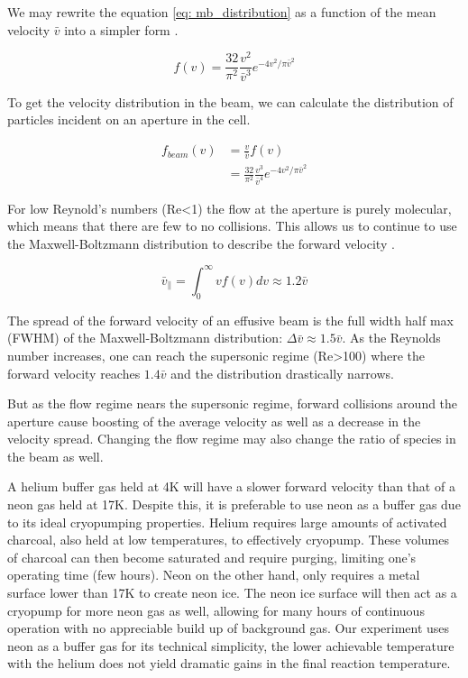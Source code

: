 We may rewrite the equation \ref{eq: mb_distribution} as a function of the mean velocity $\bar{v}$ into a simpler form .

\begin{equation}
	f(v) = \frac{32}{\pi^2} \frac{v^2}{\bar{v}^3} e^{-4v^2/\pi \bar{v}^2} \label{eq: mb_simplified}
\end{equation}

To get the velocity distribution in the beam, we can calculate the distribution of particles incident on an aperture in the cell.

\begin{align*}
	f_{beam}(v) & = \frac{v}{\bar{v}}f(v)  \\
	& = \frac{32}{\pi^2} \frac{v^3}{\bar{v}^4} e^{-4v^2/\pi \bar{v}^2}
\end{align*}

For low Reynold's numbers (Re<1) the flow at the aperture is purely molecular, which means that there are few to no collisions. This allows us to continue to use the Maxwell-Boltzmann distribution to describe the forward velocity \cite{Hutzler2011c}.

\begin{equation}
	\bar{v}_\parallel = \int_0^\infty v f(v) dv \approx 1.2 \bar{v}
\end{equation}

The spread of the forward velocity of an effusive beam is the full width half max (FWHM) of the Maxwell-Boltzmann distribution: $\Delta\bar{v} \approx 1.5 \bar{v}$. As the Reynolds number increases, one can reach the supersonic regime (Re>100) where the forward velocity reaches $1.4\bar{v}$ and the distribution drastically narrows.\cite{Hutzler2011c,Pauly}

But as the flow regime nears the supersonic regime, forward collisions around the aperture cause boosting of the average velocity as well as a decrease in the velocity spread. Changing the flow regime may also change the ratio of species in the beam as well.

A helium buffer gas held at 4K will have a slower forward velocity than that of a neon gas held at 17K. Despite this, it is preferable to use neon as a buffer gas due to its ideal cryopumping properties. Helium requires large amounts of activated charcoal, also held at low temperatures, to effectively cryopump. These volumes of charcoal can then become saturated and require purging, limiting one's operating time (few hours). Neon on the other hand, only requires a metal surface lower than 17K to create neon ice. The neon ice surface will then act as a cryopump for more neon gas as well, allowing for many hours of continuous operation with no appreciable build up of background gas. Our experiment uses neon as a buffer gas for its technical simplicity, the lower achievable temperature with the helium does not yield dramatic gains in the final reaction temperature.

